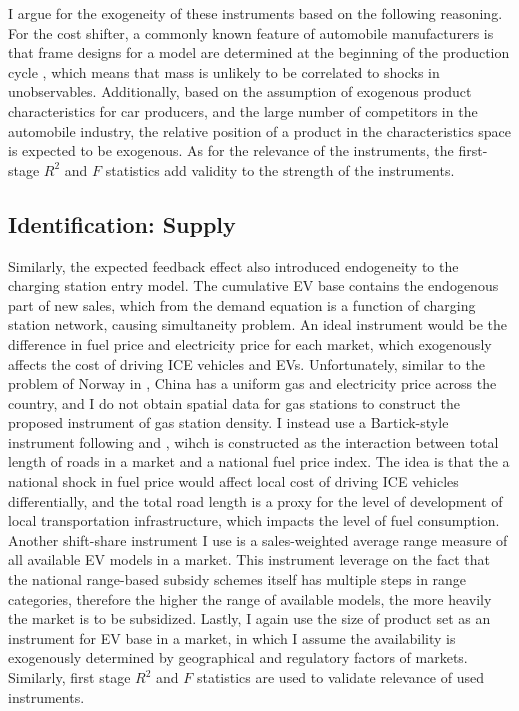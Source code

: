 \documentclass[12pt]{article}
\begin{document}
I argue for the exogeneity of these instruments based on the following reasoning. For the cost shifter, 
a commonly known feature of automobile manufacturers is that frame designs for a model are determined at the beginning of the production cycle \citep{barwick_attribute-based_2024},
which means that mass is unlikely to be correlated to shocks in unobservables. Additionally, 
based on the assumption of exogenous product characteristics for car producers, and the large number of competitors in the automobile industry,
the relative position of a product in the characteristics space is expected to be exogenous. 
As for the relevance of the instruments, the first-stage $R^2$ and $F$ statistics add validity to the strength of the instruments.

    \subsection{Identification: Supply}
\hspace*{\parindent} Similarly, the expected feedback effect also introduced endogeneity to the charging station entry model.
The cumulative EV base contains the endogenous part of new sales, which from the demand equation is a function of charging station network,
causing simultaneity problem. An ideal instrument would be the difference in fuel price and electricity price for each market, which exogenously affects the cost of driving ICE vehicles and EVs. 
Unfortunately, similar to the problem of Norway in \citet{springel_network_2021}, China has a uniform gas and electricity price across the country,
and I do not obtain spatial data for gas stations to construct the proposed instrument of gas station density.
I instead use a Bartick-style instrument following \citet{li_market_2017} and \citet{koch_when_2022}, 
wihch is constructed as the interaction between total length of roads in a market and a national fuel price index.
The idea is that the a national shock in fuel price would affect local cost of driving ICE vehicles differentially, 
and the total road length is a proxy for the level of development of local transportation infrastructure, which impacts the level of fuel consumption.
Another shift-share instrument I use is a sales-weighted average range measure of all available EV models in a market.
This instrument leverage on the fact that the national range-based subsidy schemes itself has multiple steps in range categories,
therefore the higher the range of available models, the more heavily the market is to be subsidized.
Lastly, I again use the size of product set as an instrument for EV base in a market, in which I assume the availability is exogenously determined by geographical and regulatory factors of markets.
Similarly, first stage $R^2$ and $F$ statistics are used to validate relevance of used instruments.
\end{document}
